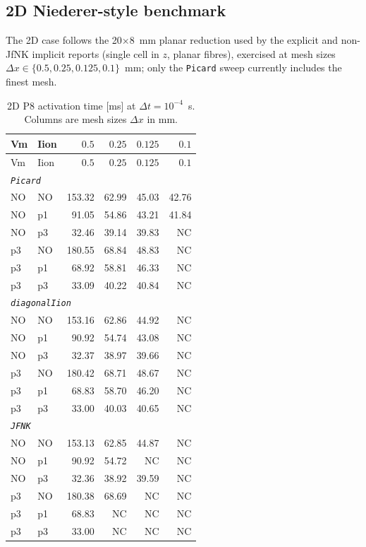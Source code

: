 \documentclass[11pt,a4paper]{article}
\newcommand{\code}[1]{\texttt{\small #1}}
\begin{document}
\subsection{2D Niederer-style benchmark}
\label{sec:results:2D}

The 2D case follows the 20$\times$8~mm planar reduction used by the
explicit and non-JfNK implicit reports (single cell in $z$, planar
fibres), exercised at mesh sizes
$\Delta x\in\{0.5, 0.25, 0.125, 0.1\}$~mm; only the \code{Picard} sweep
currently includes the finest mesh.

\begin{center}\footnotesize
\begin{longtable}{llrrrr}
\caption{2D P8 activation time [ms] at $\Delta t = 10^{-4}$~s. Columns
are mesh sizes $\Delta x$ in mm.}\\
\toprule
Vm & Iion & $0.5$ & $0.25$ & $0.125$ & $0.1$ \\
\midrule\endfirsthead\toprule
Vm & Iion & $0.5$ & $0.25$ & $0.125$ & $0.1$ \\
\midrule\endhead
\multicolumn{6}{l}{\textit{\code{Picard}}}\\
NO & NO & 153.32 & 62.99 & 45.03 & 42.76 \\
NO & p1 &  91.05 & 54.86 & 43.21 & 41.84 \\
NO & p3 &  32.46 & 39.14 & 39.83 & NC    \\
p3 & NO & 180.55 & 68.84 & 48.83 & NC    \\
p3 & p1 &  68.92 & 58.81 & 46.33 & NC    \\
p3 & p3 &  33.09 & 40.22 & 40.84 & NC    \\\hline
\multicolumn{6}{l}{\textit{\code{diagonalIion}}}\\
NO & NO & 153.16 & 62.86 & 44.92 & NC    \\
NO & p1 &  90.92 & 54.74 & 43.08 & NC    \\
NO & p3 &  32.37 & 38.97 & 39.66 & NC    \\
p3 & NO & 180.42 & 68.71 & 48.67 & NC    \\
p3 & p1 &  68.83 & 58.70 & 46.20 & NC    \\
p3 & p3 &  33.00 & 40.03 & 40.65 & NC    \\\hline
\multicolumn{6}{l}{\textit{\code{JFNK}}}\\
NO & NO & 153.13 & 62.85 & 44.87 & NC    \\
NO & p1 &  90.92 & 54.72 & NC    & NC    \\
NO & p3 &  32.36 & 38.92 & 39.59 & NC    \\
p3 & NO & 180.38 & 68.69 & NC    & NC    \\
p3 & p1 &  68.83 & NC    & NC    & NC    \\
p3 & p3 &  33.00 & NC    & NC    & NC    \\
\bottomrule\end{longtable}\end{center}
\end{document}
